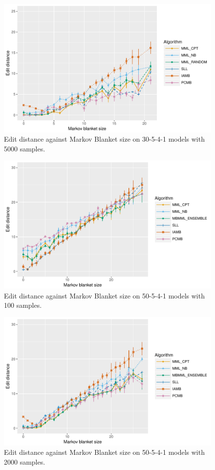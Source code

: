 \documentclass{svmult}
\begin{document}
\begin{figure}[hbt]
  \centering
    \includegraphics[scale=0.6]{figures/ed_vs_mbsize_30_5_4_1_5000.pdf}
  \caption{Edit distance against Markov Blanket size on 30-5-4-1 models with 5000 samples.}
\end{figure} 

\begin{figure}[hbt]
  \centering
    \includegraphics[scale=0.6]{figures/ed_vs_mbsize_50_5_4_1_100.pdf}
  \caption{Edit distance against Markov Blanket size on 50-5-4-1 models with 100 samples.}
\end{figure} 

\begin{figure}[hbt]
  \centering
    \includegraphics[scale=0.6]{figures/ed_vs_mbsize_50_5_4_1_2000.pdf}
  \caption{Edit distance against Markov Blanket size on 50-5-4-1 models with 2000 samples.}
\end{figure} 
\end{document}
